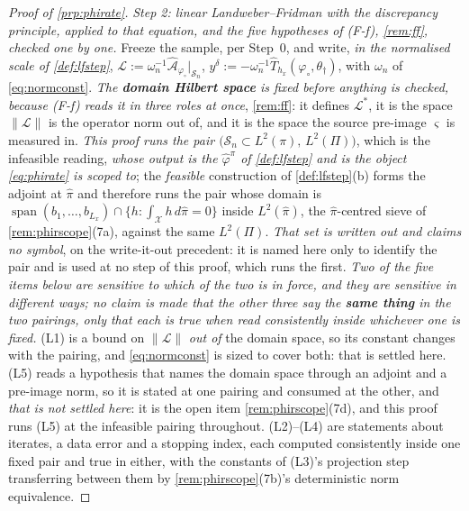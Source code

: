 \begin{proof}[Proof of \cref{prp:phirate}]
\emph{Step 2: linear Landweber--Fridman with the discrepancy principle, applied to that equation, and
the five hypotheses of \textup{(F-f)}, \cref{rem:ff}, checked one by one.} Freeze the sample, per
Step~0, and write, \emph{in the normalised scale of \cref{def:lfstep}},
$\mathcal L:=\omega_n^{-1}\hat{\mathcal A}_{\varphi_\circ}\vert_{\mathcal S_n}$,
$y^\delta:=-\omega_n^{-1}\hat T_{h_x}(\varphi_\circ,\theta_\dagger)$, with $\omega_n$ of
\eqref{eq:normconst}.
\emph{The \textbf{domain Hilbert space} is fixed before anything is checked, because
\textup{(F-f)} reads it in three roles at once}, \cref{rem:ff}: it defines $\mathcal L^{\ast}$, it is
the space $\|\mathcal L\|$ is the operator norm out of, and it is the space the source pre-image
$\varsigma$ is measured in. \emph{This proof runs the pair
$\big(\mathcal S_n\subset L^{2}(\pi),\,L^{2}(\Pi)\big)$}, which is the infeasible reading, \emph{whose
output is the $\hat\varphi^{\pi}$ of \cref{def:lfstep} and is the object \eqref{eq:phirate} is scoped
to}; the
\emph{feasible} construction of \cref{def:lfstep}\textup{(b)} forms the adjoint at $\hat\pi$ and
therefore runs the pair whose domain is
$\operatorname{span}(b_1,\dots,b_{L_x})\cap\{h:\int_{\mathcal X}h\,d\hat\pi=0\}$ inside
$L^{2}(\hat\pi)$, the $\hat\pi$-centred sieve of \cref{rem:phirscope}\textup{(7a)}, against the same
$L^{2}(\Pi)$. \emph{That set is written out and claims no symbol}, on the write-it-out precedent: it is
named here only to identify the pair and is used at no step of this proof, which runs the first. \emph{Two of the five items below are sensitive to which of the two
is in force, and they are sensitive in different ways; no claim is made that the other three say the
\textbf{same thing} in the two pairings, only that each is true when read consistently inside whichever
one is fixed.} \textup{(L1)} is a bound on
$\|\mathcal L\|$ \emph{out of} the domain space, so its constant changes with the pairing, and
\eqref{eq:normconst} is sized to cover both: that is settled here. \textup{(L5)} reads a hypothesis
that names the domain space through an adjoint and a pre-image norm, so it is stated at one pairing and
consumed at the other, and \emph{that is not settled here}: it is the open item
\cref{rem:phirscope}\textup{(7d)}, and this proof runs \textup{(L5)} at the infeasible pairing
throughout. \textup{(L2)}--\textup{(L4)} are statements about iterates, a data error and a stopping
index, each computed consistently inside one fixed pair and true in either, with the constants of
\textup{(L3)}'s projection step transferring between them by
\cref{rem:phirscope}\textup{(7b)}'s deterministic norm equivalence.

\end{proof}

